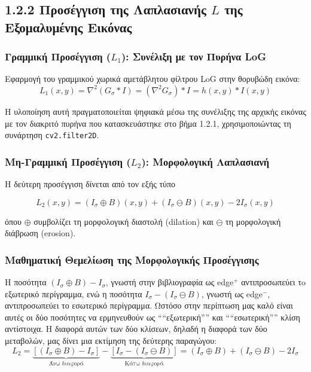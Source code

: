 \documentclass[12pt,a4paper]{article}
\begin{document}
\subsection*{1.2.2 Προσέγγιση της Λαπλασιανής $L$ της Εξομαλυμένης Εικόνας}

\subsubsection*{Γραμμική Προσέγγιση ($L_1$): Συνέλιξη με τον Πυρήνα \foreignlanguage{english}{LoG}}
Εφαρμογή του γραμμικού χωρικά αμετάβλητου φίλτρου \foreignlanguage{english}{LoG} στην θορυβώδη εικόνα:
\begin{equation}
L_1(x,y) = \nabla^2(G_\sigma * I) = (\nabla^2 G_\sigma) * I = h(x,y) * I(x,y)
\end{equation}

Η υλοποίηση αυτή πραγματοποιείται ψηφιακά μέσω της συνέλιξης της αρχικής εικόνας με τον διακριτό πυρήνα που κατασκευάστηκε στο βήμα 1.2.1, χρησιμοποιώντας τη συνάρτηση \texttt{\foreignlanguage{english}{cv2.filter2D}}.

\subsubsection*{Μη-Γραμμική Προσέγγιση ($L_2$): Μορφολογική Λαπλασιανή}
Η δεύτερη προσέγγιση δίνεται από τον εξής τύπο

\begin{equation}
L_2(x,y) = (I_\sigma \oplus B)(x,y) + (I_\sigma \ominus B)(x,y) - 2I_\sigma(x,y)
\end{equation}

όπου $\oplus$ συμβολίζει τη μορφολογική διαστολή (\foreignlanguage{english}{dilation}) και $\ominus$ τη μορφολογική διάβρωση (\foreignlanguage{english}{erosion}).

\subsubsection*{Μαθηματική Θεμελίωση της Μορφολογικής Προσέγγισης}

\hspace{0.6cm}Η ποσότητα $(I_\sigma \oplus B) - I_\sigma$, γνωστή στην βιβλιογραφία ως \foreignlanguage{english}{edge}$^+$ αντιπροσωπεύει τo εξωτερικό περίγραμμα, ενώ η ποσότητα $I_\sigma - (I_\sigma \ominus B)$, γνωστή ως \foreignlanguage{english}{edge}$^-$, αντιπροσωπεύει το εσωτερικό περίγραμμα. Ωστόσο στην περίπτωση μας καλό είναι αυτές οι δύο ποσότητες να ερμηνευθούν ως  ````εξωτερική'''' και ````εσωτερική'''' κλίση αντίστοιχα. Η διαφορά αυτών των δύο κλίσεων, δηλαδή η διαφορά των δύο μεταβολών, μας δίνει μια εκτίμηση της δεύτερης παραγώγου:
\begin{equation}
L_2 = \underbrace{[(I_\sigma \oplus B) - I_\sigma]}_{\text{Άνω διαφορά}} - \underbrace{[I_\sigma - (I_\sigma \ominus B)]}_{\text{Κάτω διαφορά}} = (I_\sigma \oplus B) + (I_\sigma \ominus B) - 2I_\sigma
\end{equation}
\end{document}
